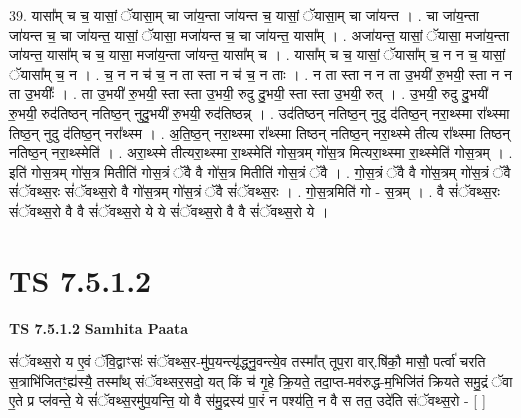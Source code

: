 \documentclass[17pt]{extarticle}
\begin{document}
39. यासा᳚म् च च॒ यासां॒ ॅयासा॒म् चा जा॑य॒न्ता जा॑यन्त च॒ यासां॒ ॅयासा॒म् चा जा॑यन्त । . चा जा॑य॒न्ता जा॑यन्त च॒ चा जा॑यन्त॒ यासां॒ ॅयासा॒ मजा॑यन्त च॒ चा जा॑यन्त॒ यासा᳚म् । . अजा॑यन्त॒ यासां॒ ॅयासा॒ मजा॑य॒न्ता जा॑यन्त॒ यासा᳚म् च च॒ यासा॒ मजा॑य॒न्ता जा॑यन्त॒ यासा᳚म् च । . यासा᳚म् च च॒ यासां॒ ॅयासा᳚म् च॒ न न च॒ यासां॒ ॅयासा᳚म् च॒ न । . च॒ न न च॑ च॒ न ता स्ता न च॑ च॒ न ताः । . न ता स्ता न न ता उ॒भयी॑ रु॒भयी॒ स्ता न न ता उ॒भयीः᳚ । . ता उ॒भयी॑ रु॒भयी॒ स्ता स्ता उ॒भयी॒ रुदु दु॒भयी॒ स्ता स्ता उ॒भयी॒ रुत् । . उ॒भयी॒ रुदु दु॒भयी॑ रु॒भयी॒ रुद॑तिष्ठन् नतिष्ठ॒न् नुदु॒भयी॑ रु॒भयी॒ रुद॑तिष्ठन्न् । . उद॑तिष्ठन् नतिष्ठ॒न् नुदु द॑तिष्ठ॒न् नरा॒थ्स्मा रा᳚थ्स्मा तिष्ठ॒न् नुदु द॑तिष्ठ॒न् नरा᳚थ्स्म । . अ॒ति॒ष्ठ॒न् नरा॒थ्स्मा रा᳚थ्स्मा तिष्ठन् नतिष्ठ॒न् नरा॒थ्स्मे तीत्य रा᳚थ्स्मा तिष्ठन् नतिष्ठ॒न् नरा॒थ्स्मेति॑ । . अरा॒थ्स्मे तीत्यरा॒थ्स्मा रा॒थ्स्मेति॑ गोस॒त्रम् गो॑स॒त्र मित्यरा॒थ्स्मा रा॒थ्स्मेति॑ गोस॒त्रम् । . इति॑ गोस॒त्रम् गो॑स॒त्र मितीति॑ गोस॒त्रं ॅवै वै गो॑स॒त्र मितीति॑ गोस॒त्रं ॅवै । . गो॒स॒त्रं ॅवै वै गो॑स॒त्रम् गो॑स॒त्रं ॅवै सं॑ॅवथ्स॒रः सं॑ॅवथ्स॒रो वै गो॑स॒त्रम् गो॑स॒त्रं ॅवै सं॑ॅवथ्स॒रः । . गो॒स॒त्रमिति॑ गो - स॒त्रम् । . वै सं॑ॅवथ्स॒रः सं॑ॅवथ्स॒रो वै वै सं॑ॅवथ्स॒रो ये ये सं॑ॅवथ्स॒रो वै वै सं॑ॅवथ्स॒रो ये । \newline
\pagebreak
{}

\section{ TS 7.5.1.2 }

\textbf{TS 7.5.1.2 } \newline
\textbf{Samhita Paata} \newline

सं॑ॅवथ्स॒रो य ए॒वं ॅवि॒द्वाꣳसः॑ संॅवथ्स॒र-मु॑प॒यन्त्यृ॑द्ध्नु॒वन्त्ये॒व तस्मा᳚त् तूप॒रा वार्.षि॑कौ॒ मासौ॒ पर्त्वा॑ चरति स॒त्राभि॑जितꣳ॒॒ह्य॑स्यै॒ तस्मा᳚थ् संॅवथ्सर॒सदो॒ यत् किं च॑ गृ॒हे क्रि॒यते॒ तदा॒प्त-मव॑रुद्ध-म॒भिजि॑तं क्रियते समु॒द्रं ॅवा ए॒ते प्र प्ल॑वन्ते॒ ये सं॑ॅवथ्स॒रमु॑प॒यन्ति॒ यो वै स॑मु॒द्रस्य॑ पा॒रं न पश्य॑ति॒ न वै स तत॒ उदे॑ति संॅवथ्स॒रो - [  ] \newline
\end{document}
